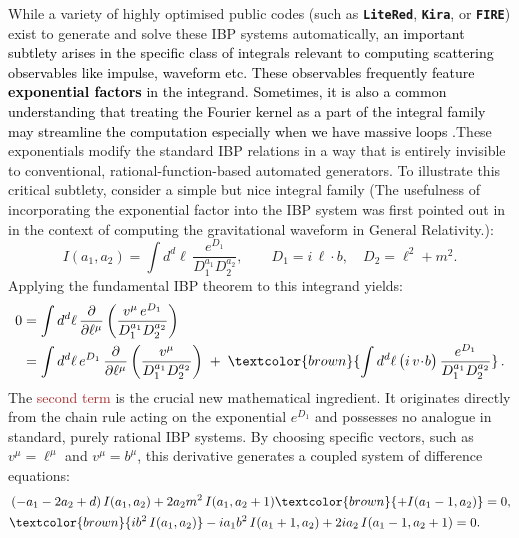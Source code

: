 While a variety of highly optimised public codes (such as \textbf{\texttt{LiteRed}}\cite{Lee:2012cn}, \textbf{\texttt{Kira}}\cite{Maierhofer:2017gsa}, or \textbf{\texttt{FIRE}}\cite{Smirnov:2019qkx}) exist to generate and solve these IBP systems automatically, \textcolor{black}{ an important subtlety arises in the specific class of integrals relevant to computing scattering observables like impulse, waveform etc. These observables frequently feature \textbf{exponential factors} in the integrand. Sometimes, it is also a common understanding that treating the Fourier kernel as a part of the integral family may streamline the computation especially when we have massive loops  .}These exponentials modify the standard IBP relations in a way that is entirely invisible to conventional, rational-function-based automated generators. To illustrate this critical subtlety, consider a simple but nice integral family (The usefulness of incorporating the exponential factor into the IBP system was first pointed out in \cite{Brunello:2024ibk} in the context of computing the gravitational waveform in General Relativity.):
\begin{equation}
    I(a_1,a_2)
    =\int d^d\ell\,
    \frac{e^{D_1}}{D_1^{a_1}D_2^{a_2}},
    \qquad
    D_1=i\,\ell\!\cdot\! b,\quad
    D_2=\ell^2+m^2 .
\end{equation}
Applying the fundamental IBP theorem to this integrand yields:
\begin{equation}
\begin{split}
0
&=\int d^d\ell\,
\frac{\partial}{\partial \ell^\mu}
\left(
  \frac{v^\mu\,e^{D_1}}{D_1^{a_1}D_2^{a_2}}
\right)
\nonumber\\
&=\int d^d\ell\,
e^{D_1}\,
\frac{\partial}{\partial \ell^\mu}
\left(
  \frac{v^\mu}{D_1^{a_1}D_2^{a_2}}
\right)
\;+\;
\textcolor{brown}{
\int d^d\ell\,
\bigl(i\,v\!\cdot\! b\bigr)\,
\frac{e^{D_1}}{D_1^{a_1}D_2^{a_2}}
}\,.
\end{split}
\label{eq:exp-ibp-splitting}
\end{equation}
The \textcolor{brown}{second term} is the crucial new mathematical ingredient. It originates directly from the chain rule acting on the exponential $e^{D_1}$ and possesses no analogue in standard, purely rational IBP systems. By choosing specific vectors, such as $v^\mu=\ell^\mu$ and $v^\mu=b^\mu$, this derivative generates a coupled system of difference equations:
\begin{equation}
\begin{split}
&\left(-a_1-2a_2+d\right) I(a_1,a_2)
+2a_2 m^2\, I(a_1,a_2+1)
\textcolor{brown}{+I(a_1-1,a_2)}=0,
\\
&\textcolor{brown}{i b^2\, I(a_1,a_2)}
-i a_1 b^2\, I(a_1+1,a_2)
+2 i a_2\, I(a_1-1,a_2+1)=0.
\end{split}
\label{eq:exp-ibp-identities}
\end{equation}
